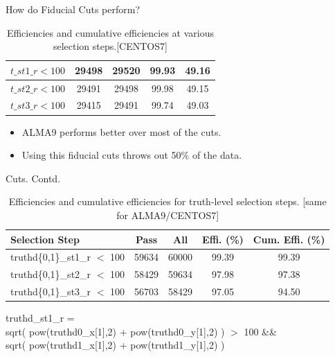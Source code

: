 \begin{frame}{How do Fiducial Cuts perform?}
\begin{table}[h!]
\begin{tabular}{|l|c|c|c|c|}
        $t\_st1\_r < 100$        & 29498        & 29520       & 99.93                   & 49.16                              \\ \hline
        $t\_st2\_r < 100$        & 29491        & 29498       & 99.98                   & 49.15                              \\ \hline
        $t\_st3\_r < 100$        & 29415        & 29491       & 99.74                   & 49.03                              \\ \hline
        \end{tabular}
        \caption{Efficiencies and cumulative efficiencies at various selection steps.[CENTOS7]}
        \label{table:efficiency_updated}
        \end{table}        
        \vspace{-0.5cm}
        \begin{itemize}
            \item ALMA9 performs better over most of the cuts. 
            \item Using this fiducial cuts throws out 50\% of the data.
        \end{itemize}        
\end{frame}

\begin{frame}{Cuts. Contd.}
    \begin{table}[h!]
        \centering
        \small
        \begin{tabular}{|l|c|c|c|c|}
        \hline
        \textbf{Selection Step} & \textbf{Pass} & \textbf{All} & \textbf{Effi. (\%)} & \textbf{Cum. Effi. (\%)} \\ \hline
        truthd\{0,1\}\_st1\_r $<$ 100    & 59634        & 60000       & 99.39                   & 99.39                              \\ \hline
        truthd\{0,1\}\_st2\_r $<$ 100   & 58429        & 59634       & 97.98                   & 97.38                              \\ \hline
        truthd\{0,1\}\_st3\_r $<$ 100   & 56703        & 58429       & 97.05                   & 94.50                              \\ \hline
        \end{tabular}
        \caption{Efficiencies and cumulative efficiencies for truth-level selection steps. [same for ALMA9/CENTOS7]}
        \label{table:truth_efficiency}
    \end{table}
        truthd\_st1\_r = \\
        \hspace{0.5cm}sqrt( pow(truthd0\_x[1],2) + pow(truthd0\_y[1],2) ) $>$ 100 \&\& \\
        \hspace{0.5cm}sqrt( pow(truthd1\_x[1],2) + pow(truthd1\_y[1],2) )
\end{frame}

